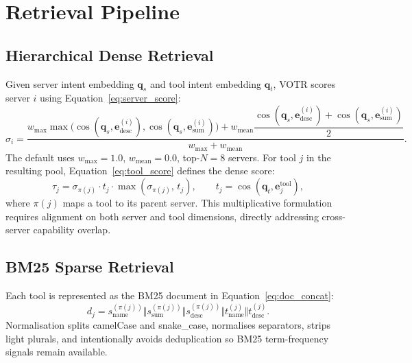 \documentclass[sigconf,anonymous,review]{acmart}
\newcommand{\votr}{\textsc{VOTR}\xspace}
\begin{document}
\section{Retrieval Pipeline}

\subsection{Hierarchical Dense Retrieval}
Given server intent embedding $\mathbf{q}_s$ and tool intent embedding
$\mathbf{q}_t$, \votr scores server $i$ using Equation~\eqref{eq:server_score}:
\begin{equation}
\label{eq:server_score}
  \sigma_i =
  \frac{
    w_{\max}\max\!\bigl(\cos(\mathbf{q}_s,\mathbf{e}^{(i)}_{\mathrm{desc}}),
                        \cos(\mathbf{q}_s,\mathbf{e}^{(i)}_{\mathrm{sum}})\bigr)
    + w_{\mathrm{mean}}\dfrac{\cos(\mathbf{q}_s,\mathbf{e}^{(i)}_{\mathrm{desc}})
                 + \cos(\mathbf{q}_s,\mathbf{e}^{(i)}_{\mathrm{sum}})}{2}
  }{w_{\max}+w_{\mathrm{mean}}}.
\end{equation}
The default uses $w_{\max}=1.0$, $w_{\mathrm{mean}}=0.0$, top-$N=8$ servers.
For tool $j$ in the resulting pool, Equation~\eqref{eq:tool_score} defines the
dense score:
\begin{equation}
\label{eq:tool_score}
  \tau_j = \sigma_{\pi(j)} \cdot t_j \cdot \max(\sigma_{\pi(j)},\, t_j),
  \qquad
  t_j = \cos(\mathbf{q}_t,\mathbf{e}^{\mathrm{tool}}_j),
\end{equation}
where $\pi(j)$ maps a tool to its parent server.
This multiplicative formulation requires alignment on both server and tool
dimensions, directly addressing cross-server capability overlap.

\subsection{BM25 Sparse Retrieval}
Each tool is represented as the BM25 document in Equation~\eqref{eq:doc_concat}:
\begin{equation}
\label{eq:doc_concat}
  d_j = s_{\mathrm{name}}^{(\pi(j))} \Vert s_{\mathrm{sum}}^{(\pi(j))}
        \Vert s_{\mathrm{desc}}^{(\pi(j))} \Vert
        t_{\mathrm{name}}^{(j)} \Vert t_{\mathrm{desc}}^{(j)}.
\end{equation}
Normalisation splits camelCase and snake\_case, normalises separators, strips light
plurals, and intentionally avoids deduplication so BM25 term-frequency signals
remain available.
\end{document}
